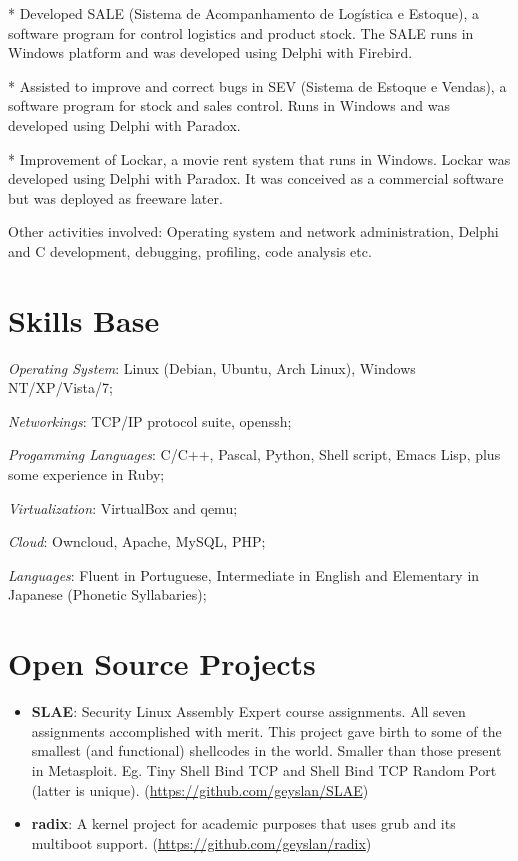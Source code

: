 \documentclass[margin]{res}
\begin{document}
\begin{resume}
* Developed SALE (Sistema de Acompanhamento de Logística e Estoque), a software
program for control logistics and product stock. The SALE runs in Windows
platform and was developed using Delphi with Firebird.

* Assisted to improve and correct bugs in SEV (Sistema de Estoque e Vendas), a
software program for stock and sales control. Runs in Windows and was developed
using Delphi with Paradox.

* Improvement of Lockar, a movie rent system that runs in Windows. Lockar was
developed using Delphi with Paradox. It was conceived as a commercial software
but was deployed as freeware later.

Other activities involved: Operating system and network administration, Delphi
and C development, debugging, profiling, code analysis etc.

\section{Skills Base} \textit{Operating System}: Linux (Debian, Ubuntu, Arch
Linux), Windows NT/XP/Vista/7;

\textit{Networkings}: TCP/IP protocol suite, openssh;

\textit{Progamming Languages}: C/C++, Pascal, Python, Shell script, Emacs Lisp,
plus some experience in Ruby;

\textit{Virtualization}: VirtualBox and qemu;

\textit{Cloud}: Owncloud, Apache, MySQL, PHP;

\textit{Languages}: Fluent in Portuguese, Intermediate in English and
Elementary in Japanese (Phonetic Syllabaries);

\section{Open Source Projects}
\begin{itemize}
\item \textbf{SLAE}: Security Linux Assembly Expert course assignments. All
  seven assignments accomplished with merit. This project gave birth to some of
  the smallest (and functional) shellcodes in the world. Smaller than those
  present in Metasploit. Eg. Tiny Shell Bind TCP and Shell Bind TCP Random Port
  (latter is unique).\newline
  (\url{https://github.com/geyslan/SLAE})\vspace{1mm}

\item \textbf{radix}: A kernel project for academic purposes that uses grub and
  its multiboot support.\newline
  (\url{https://github.com/geyslan/radix})\vspace{1mm}


\end{itemize}
\end{resume}
\end{document}
